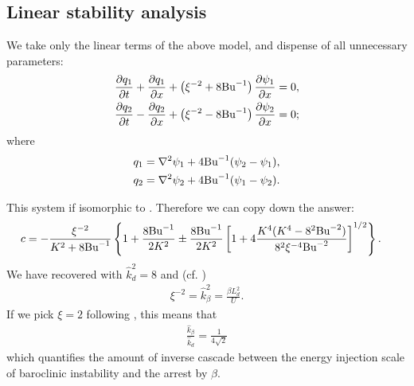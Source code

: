 \subsection{Linear stability analysis}
We take only the linear terms of the above model, and dispense of all unnecessary parameters:
\begin{align}
    &\frac{\partial q_1}{\partial t}+\frac{\partial q_1}{\partial x}+\left(\xi^{-2}+8\text{Bu}^{-1}\right)\frac{\partial\psi_1}{\partial x} = 0,\label{eq:2lay_sym_eq1_lin}\\
    &\frac{\partial q_2}{\partial t}-\frac{\partial q_2}{\partial x}+\left(\xi^{-2}-8\text{Bu}^{-1}\right)\frac{\partial\psi_2}{\partial x} = 0;\label{eq:2lay_sym_eq2_lin}
\end{align}
where
\begin{align}
    q_1 &= \nabla^2\psi_1 + 4\text{Bu}^{-1}(\psi_2-\psi_1),\label{eq:2lay_sym_pv1_lin}\\
    q_2 &= \nabla^2\psi_2 + 4\text{Bu}^{-1}(\psi_1-\psi_2).\label{eq:2lay_sym_pv2_lin}
\end{align}

This system if isomorphic to \cite[(9.107)]{Vallis_17}. Therefore we can copy down the answer:
\begin{align}
    c &= -\frac{\xi^{-2}}{K^2+8\text{Bu}^{-1}}\left\{ 1+\frac{8\text{Bu}^{-1}}{2K^2}\pm\frac{8\text{Bu}^{-1}}{2K^2}\left[1+4\frac{K^4(K^4-8^2\text{Bu}^{-2})}{8^2\xi^{-4}\text{Bu}^{-2}}\right]^{1/2} \right\}.
\end{align}
We have recovered \cite[(9.114)]{Vallis_17} with $\hat{k}_d^2 = 8$ and (cf. \cite[(9.115)]{Vallis_17})
\begin{align}
    \xi^{-2} = \hat{k}_\beta^2 = \frac{\beta L_d^2}{U}.
\end{align}
If we pick $\xi=2$ following \cite[Table 1]{HeldLarichev_96}, this means that
\begin{align}
    \frac{\hat{k}_\beta}{\hat{k}_d} = \frac{1}{4\sqrt{2}}
\end{align}
which quantifies the amount of inverse cascade between the energy injection scale of baroclinic instability and the arrest by $\beta$.